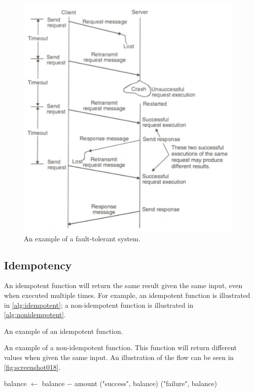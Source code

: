 \begin{figure}[h]
\centering
\includegraphics[width=0.4\linewidth]{figures/screenshot017}
\caption{An example of a fault-tolerant system.}
\label{fig:screenshot017}
\end{figure}

\subsection{Idempotency}
\label{ssec:idempotency}
An idempotent function will return the same result given the same input, even when executed multiple times. For example, an idempotent function is illustrated in \autoref{alg:idempotent}; a non-idempotent function is illustrated in \autoref{alg:nonidempotent}.

\begin{algorithm}
\caption{An example of an idempotent function.}
\label{alg:idempotent}
\begin{algorithmic}
	\State \Return {}
\EndFunction
\end{algorithmic}
\end{algorithm}

\begin{algorithm}
\caption[Example of a non-idempotent function]{An example of a non-idempotent function. This function will return different values when given the same input. An illustration of the flow can be seen in \autoref{fig:screenshot018}.}
\label{alg:nonidempotent}
\begin{algorithmic}
		\State balance $\gets$ balance $-$ amount
		\State \Return ("success", balance)
	\Else
		\State \Return ("failure", balance)
	\EndIf
\EndFunction
\end{algorithmic}
\end{algorithm}

